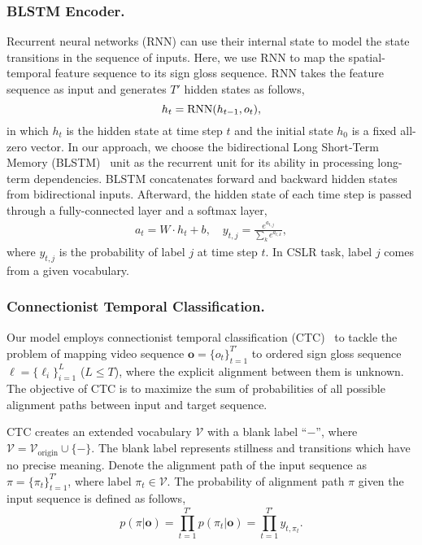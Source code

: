 \documentclass[letterpaper]{article} \usepackage{aaai20}  \usepackage{times}  \usepackage{helvet} \usepackage{courier}  \usepackage[hyphens]{url}  \usepackage{graphicx} \urlstyle{rm} \def\UrlFont{\rm}  \usepackage{graphicx}  \frenchspacing  \setlength{\pdfpagewidth}{8.5in}  \setlength{\pdfpageheight}{11in}
\def\lbf{{\boldsymbol\ell}}
\def\lnf{{\ell}}
\begin{document}
\subsubsection{BLSTM Encoder.}
Recurrent neural networks (RNN) can use their internal state to model the state transitions in the sequence of inputs. Here, we use RNN to map the spatial-temporal feature sequence to its sign gloss sequence. RNN takes the feature sequence as input and generates $T'$ hidden states as follows,
\begin{equation}
    h_t={\rm RNN}(h_{t-1}, o_t),
\end{equation}  
in which $h_t$ is the hidden state at time step $t$ and the initial state $h_0$ is a fixed all-zero vector. 
In our approach, we choose the bidirectional Long Short-Term Memory (BLSTM)~\cite{LSTM} unit as the recurrent unit for its ability in processing long-term dependencies. BLSTM concatenates forward and backward hidden states from bidirectional inputs. Afterward, the hidden state of each time step is passed through a fully-connected layer and a softmax layer,
\begin{equation}\label{rnn}
    \begin{split}
    a_t = W \cdot h_t+b, \quad
    y_{t,j}=\frac{e^{a_{t,j}}}{\sum_k e^{a_{t,k}}},
    \end{split}
\end{equation}
where $y_{t,j}$ is the probability of label $j$ at time step $t$. In CSLR task, label $j$ comes from a given vocabulary.

\subsubsection{Connectionist Temporal Classification.}
Our model employs connectionist temporal classification (CTC)~\cite{CTC} to tackle the problem of mapping video sequence $\mathbf{o}=\{o_t\}_{t=1}^{T'}$ to ordered sign gloss sequence $\lbf=\{\lnf_i\}_{i=1}^L$ ($L \le T$), where the explicit alignment between them is unknown. 
The objective of CTC is to maximize the sum of probabilities of all possible alignment paths between input and target sequence.

CTC creates an extended vocabulary $\mathcal{V}$ with a blank label ``\(-\)'', where $\mathcal{V}=\mathcal{V}_\text{origin} \cup \{-\}$. The blank label represents stillness and transitions which have no precise meaning. 
Denote the alignment path of the input sequence as $\pi = \{ \pi_t \}_{t=1}^{T'}$, where label $\pi_t \in \mathcal{V}$. The probability of alignment path $\pi$ given the input sequence is defined as follows,
\begin{equation}
    p(\pi | \mathbf{o}) = \prod_{t=1}^{T'} p(\pi_t | \mathbf{o})= \prod_{t=1}^{T'} y_{t,\pi_t}.
\end{equation}
\end{document}
